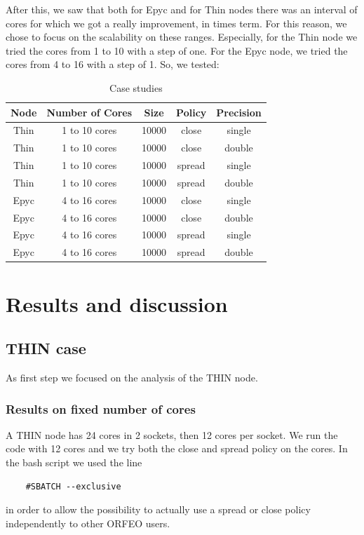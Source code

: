 \documentclass[12pt, titlepage]{report}
\begin{document}
After this, we saw that both for Epyc and for Thin nodes there was an interval of cores for which we got a really improvement, in times term.
For this reason, we chose to focus on the scalability on these ranges.
Especially, for the Thin node we tried the cores from 1 to 10 with a step of one. For the Epyc node, we tried the cores from 4 to 16 with a step of 1. 
So, we tested:
\begin{table}[h]
\centering
\begin{tabular}{|c|c|c|c|c|}
\hline
\textbf{Node} & \textbf{Number of Cores} & \textbf{Size} & \textbf{Policy} & \textbf{Precision} \\
\hline
Thin & 1 to 10 cores & 10000 & close & single \\
Thin & 1 to 10 cores & 10000 & close & double \\
Thin & 1 to 10 cores & 10000 & spread & single \\
Thin & 1 to 10 cores & 10000 & spread & double \\
\hline
Epyc & 4 to 16 cores & 10000 & close & single \\
Epyc & 4 to 16 cores & 10000 & close & double \\
Epyc & 4 to 16 cores & 10000 & spread & single \\
Epyc & 4 to 16 cores & 10000 & spread & double \\
\hline
\end{tabular}
\caption{Case studies}
\end{table}


\section{Results and discussion}

\subsection{THIN case}

As first step we focused on the analysis of the THIN node.

\subsubsection{Results on fixed number of cores}

A THIN node has 24 cores in 2 sockets, then 12 cores per socket. We run the code with 12 cores and we try both the close and spread policy on the cores. In the bash script we used the line
\begin{verbatim}
    #SBATCH --exclusive
\end{verbatim}
in order to allow the possibility to actually use a spread or close policy independently to other ORFEO users.
\end{document}
